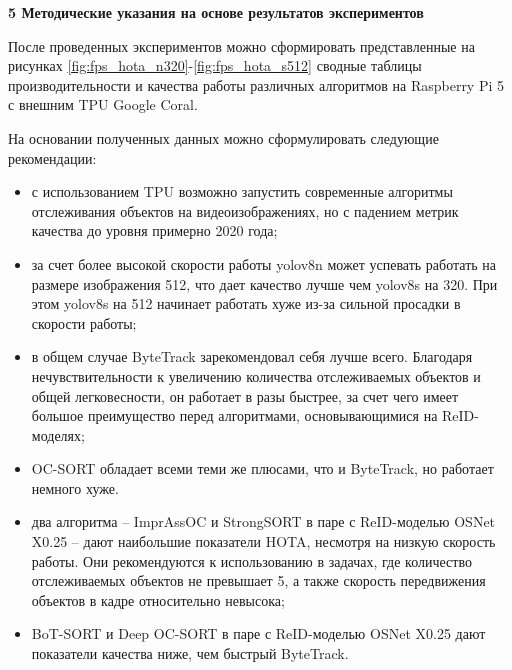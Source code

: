 \newpage
\begin{center}
  \textbf{\large 5 Методические указания на основе результатов экспериментов}
\end{center}
После проведенных экспериментов можно сформировать представленные на рисунках \ref{fig:fps_hota_n320}-\ref{fig:fps_hota_s512} сводные таблицы производительности и качества работы различных алгоритмов на Raspberry Pi 5 с внешним TPU Google Coral.

На основании полученных данных можно сформулировать следующие рекомендации:
\begin{itemize}
  \item с использованием TPU возможно запустить современные алгоритмы отслеживания объектов на видеоизображениях, но с падением метрик качества до уровня примерно 2020 года;
  \item за счет более высокой скорости работы yolov8n может успевать работать на размере изображения 512, что дает качество лучше чем yolov8s на 320. При этом yolov8s на 512 начинает работать хуже из-за сильной просадки в скорости работы;
  \item в общем случае ByteTrack зарекомендовал себя лучше всего. Благодаря нечувствительности к увеличению количества отслеживаемых объектов и общей легковесности, он работает в разы быстрее, за счет чего имеет большое преимущество перед алгоритмами, основывающимися на ReID-моделях; 
  \item OC-SORT обладает всеми теми же плюсами, что и ByteTrack, но работает немного хуже.
  \item два алгоритма -- ImprAssOC и StrongSORT в паре с ReID-моделью OSNet X0.25 -- дают наибольшие показатели HOTA, несмотря на низкую скорость работы. Они рекомендуются к использованию в задачах, где количество отслеживаемых объектов не превышает 5, а также скорость передвижения объектов в кадре относительно невысока;
  \item BoT-SORT и Deep OC-SORT в паре с ReID-моделью OSNet X0.25 дают показатели качества ниже, чем быстрый ByteTrack.
\end{itemize}




